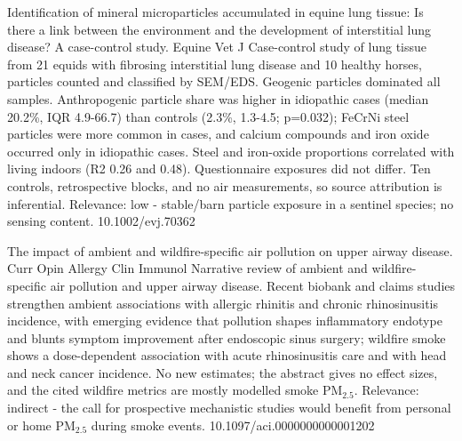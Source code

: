 \documentclass[10pt]{article}
\begin{document}
{Identification of mineral microparticles accumulated in equine lung tissue: Is there a link between the environment and the development of interstitial lung disease? A case-control study.}
{Equine Vet J}
{Case-control study of lung tissue from 21 equids with fibrosing interstitial lung disease and 10 healthy horses, particles counted and classified by SEM/EDS. Geogenic particles dominated all samples. Anthropogenic particle share was higher in idiopathic cases (median 20.2\%, IQR 4.9-66.7) than controls (2.3\%, 1.3-4.5; p=0.032); FeCrNi steel particles were more common in cases, and calcium compounds and iron oxide occurred only in idiopathic cases. Steel and iron-oxide proportions correlated with living indoors (R2 0.26 and 0.48). Questionnaire exposures did not differ. Ten controls, retrospective blocks, and no air measurements, so source attribution is inferential. Relevance: low - stable/barn particle exposure in a sentinel species; no sensing content.}
{10.1002/evj.70362}

{The impact of ambient and wildfire-specific air pollution on upper airway disease.}
{Curr Opin Allergy Clin Immunol}
{Narrative review of ambient and wildfire-specific air pollution and upper airway disease. Recent biobank and claims studies strengthen ambient associations with allergic rhinitis and chronic rhinosinusitis incidence, with emerging evidence that pollution shapes inflammatory endotype and blunts symptom improvement after endoscopic sinus surgery; wildfire smoke shows a dose-dependent association with acute rhinosinusitis care and with head and neck cancer incidence. No new estimates; the abstract gives no effect sizes, and the cited wildfire metrics are mostly modelled smoke PM$_{2.5}$. Relevance: indirect - the call for prospective mechanistic studies would benefit from personal or home PM$_{2.5}$ during smoke events.}
{10.1097/aci.0000000000001202}

\par{}\baselineskip{}\baselineskip
{}
\end{document}
